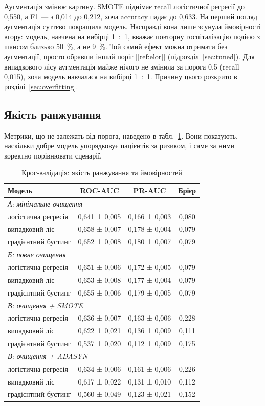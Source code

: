 \documentclass[14pt,a4paper]{extreport}
\begin{document}
Аугментація змінює картину. SMOTE піднімає recall логістичної регресії до 0,550, а F1 --- з 0,014 до 0,212, хоча accuracy падає до 0,633. На перший погляд аугментація суттєво покращила модель. Насправді вона лише зсунула ймовірності вгору: модель, навчена на вибірці 1~:~1, вважає повторну госпіталізацію подією з шансом близько 50~\%, а не 9~\%. Той самий ефект можна отримати без аугментації, просто обравши інший поріг [\ref{ref:elor}] (підрозділ~\ref{sec:tuned}). Для випадкового лісу аугментація майже нічого не змінила за порога 0,5 (recall 0,015), хоча модель навчалася на вибірці 1~:~1. Причину цього розкрито в розділі~\ref{sec:overfitting}.

\subsection{Якість ранжування}

Метрики, що не залежать від порога, наведено в табл.~\ref{tab:cv_rank}. Вони показують, наскільки добре модель упорядковує пацієнтів за ризиком, і саме за ними коректно порівнювати сценарії.

\begin{table}[H]
\caption{Крос-валідація: якість ранжування та ймовірностей}
\label{tab:cv_rank}
\small
\renewcommand{\arraystretch}{1.15}
\begin{tabularx}{\linewidth}{|X|c|c|c|}
\hline
\textbf{Модель} & \textbf{ROC-AUC} & \textbf{PR-AUC} & \textbf{Брієр} \\
\hline
\multicolumn{4}{|l|}{\textit{А: мінімальне очищення}} \\
\hline
логістична регресія & 0,641 ± 0,005 & 0,166 ± 0,003 & 0,080 \\
\hline
випадковий ліс & 0,658 ± 0,007 & 0,178 ± 0,004 & 0,079 \\
\hline
градієнтний бустинг & 0,652 ± 0,008 & 0,180 ± 0,007 & 0,079 \\
\hline
\multicolumn{4}{|l|}{\textit{Б: повне очищення}} \\
\hline
логістична регресія & 0,651 ± 0,006 & 0,172 ± 0,005 & 0,079 \\
\hline
випадковий ліс & 0,653 ± 0,008 & 0,177 ± 0,004 & 0,079 \\
\hline
градієнтний бустинг & 0,655 ± 0,006 & 0,179 ± 0,005 & 0,079 \\
\hline
\multicolumn{4}{|l|}{\textit{В: очищення + SMOTE}} \\
\hline
логістична регресія & 0,636 ± 0,007 & 0,163 ± 0,006 & 0,228 \\
\hline
випадковий ліс & 0,622 ± 0,021 & 0,136 ± 0,009 & 0,111 \\
\hline
градієнтний бустинг & 0,537 ± 0,020 & 0,112 ± 0,009 & 0,175 \\
\hline
\multicolumn{4}{|l|}{\textit{В: очищення + ADASYN}} \\
\hline
логістична регресія & 0,634 ± 0,006 & 0,161 ± 0,006 & 0,226 \\
\hline
випадковий ліс & 0,617 ± 0,022 & 0,131 ± 0,010 & 0,112 \\
\hline
градієнтний бустинг & 0,560 ± 0,049 & 0,123 ± 0,021 & 0,152 \\
\hline
\end{tabularx}
\end{table}
\end{document}
